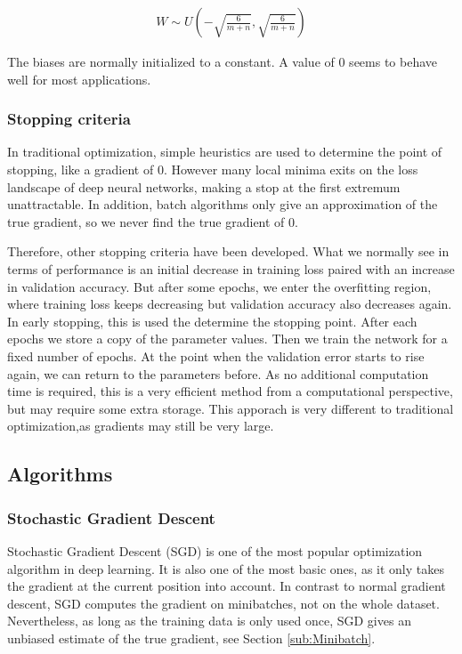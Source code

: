 \begin{align}
    W \sim U(-\sqrt{\frac{6}{m+n}}, \sqrt{\frac{6}{m+n}})
\end{align}

The biases are normally initialized to a constant. A value of 0 seems to behave
well for most applications.




\subsubsection{Stopping criteria}\label{sub:Stopping_criteria}
In traditional optimization, simple heuristics are used to determine the point
of stopping, like a gradient of 0. However many local minima exits on the loss
landscape of deep neural networks, making a stop at the first extremum
unattractable. In addition, batch algorithms only give an approximation of the
true gradient, so we never find the true gradient of 0.

Therefore, other stopping criteria have been developed. What we normally see in
terms of performance is an initial decrease in training loss paired with an
increase in validation accuracy. But after some epochs, we enter the overfitting
region, where training loss keeps decreasing but validation accuracy also
decreases again. In early stopping, this is used the determine the stopping
point. After each epochs we store a copy of the parameter values. Then we train
the network for a fixed number of epochs. At the point when the validation error
starts to rise again, we can return to the parameters before. As no additional
computation time is required, this is a very efficient method from a
computational perspective, but may require some extra storage. This apporach is
very different to traditional optimization,as gradients may still be very large.



\subsection{Algorithms}
\subsubsection{Stochastic Gradient Descent}\label{SGD}
Stochastic Gradient Descent (SGD) is one of the most popular optimization
algorithm in deep learning. It is also one of the most basic ones, as it only
takes the gradient at the current position into account. In contrast to normal
gradient descent, SGD computes the gradient on minibatches, not on the whole
dataset. Nevertheless, as long as the training data is only used once, SGD gives
an unbiased estimate of the true gradient, see Section \ref{sub:Minibatch}. 

